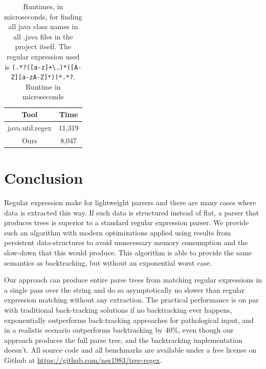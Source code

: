\documentclass[11pt,a4paper,twoside,openright]{Thesis}
\theoremstyle{definition}
\newcommand{\tablabel}[1]{\label{tab:#1}}
\begin{document}
\begin{table}[htp]\center
\begin{tabular}{cc}
\toprule
Tool & Time\tabularnewline
\midrule
java.util.regex & 11,319\tabularnewline
Ours & 8,047\tabularnewline
\bottomrule
\end{tabular}
\caption[Matching times for finding all java class names]{Runtimes, in microseconds, for finding all java class names in all
  .java files in the project itself. The regular expression used is
  \texttt{(.*?([a-z]+\textbackslash.)*([A-Z][a-zA-Z]*))*.*?}.
Runtime in microseconds}
\tablabel{real}
\end{table}


\chapter{Conclusion}
Regular expression make for lightweight parsers and there are many cases
where data is extracted this way. If such data is structured
instead of flat, a parser that produces trees is superior to a standard
regular expression parser. We provide such an algorithm with modern
optimizations applied using results from persistent data-structures to avoid
unnecessary memory consumption and the slow-down that this would produce. 
This algorithm is able to provide the same semantics as backtracking, but 
without an exponential worst case.

Our approach can produce entire parse trees from matching regular expressions
in a single pass over the string and do so asymptotically no slower than
regular expression matching without any extraction.  The practical performance
is on par with traditional back-tracking solutions if no backtracking ever
happens, exponentially outperforms back-tracking approaches for pathological
input, and in a realistic scenario outperforms backtracking by 40\%, even
though our approach produces the full parse tree, and the backtracking
implementation doesn't. All source code and all benchmarks are available under
a free license on Github\cite{Schwarz:10861} at
\url{https://github.com/nes1983/tree-regex}.




\listoffigures
\listoftables
\listofalgorithms
{}
\end{document}
